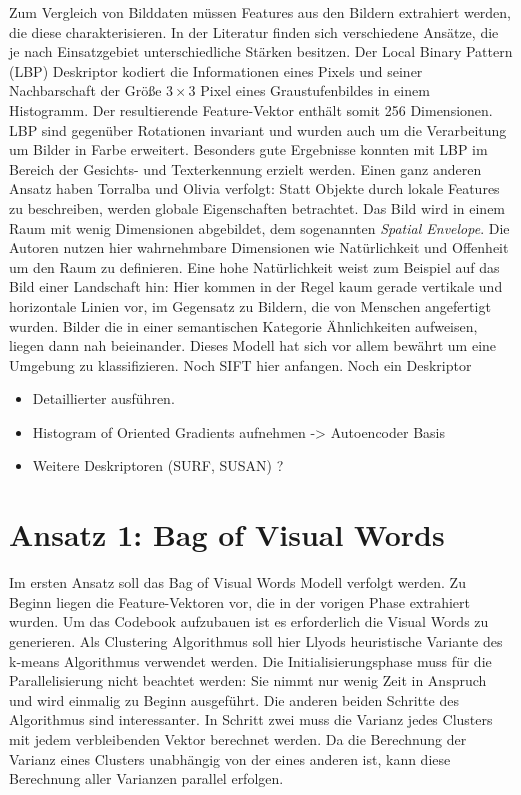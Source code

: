 Zum Vergleich von Bilddaten müssen Features aus den Bildern extrahiert werden, die diese charakterisieren. In der Literatur finden sich verschiedene Ansätze, die je nach Einsatzgebiet unterschiedliche Stärken besitzen. 
Der Local Binary Pattern (LBP) Deskriptor kodiert die Informationen eines Pixels und seiner Nachbarschaft der Größe $3 \times 3$ Pixel eines Graustufenbildes in einem Histogramm. Der resultierende Feature-Vektor enthält somit 256 Dimensionen. LBP sind gegenüber Rotationen invariant und wurden auch um die Verarbeitung um Bilder in Farbe erweitert. Besonders gute Ergebnisse konnten mit LBP im Bereich der Gesichts- und Texterkennung erzielt werden.
Einen ganz anderen Ansatz haben Torralba und Olivia verfolgt: Statt Objekte durch lokale Features zu beschreiben, werden globale Eigenschaften betrachtet. Das Bild wird in einem Raum mit wenig Dimensionen abgebildet, dem sogenannten \textit{Spatial Envelope}. Die Autoren nutzen hier wahrnehmbare Dimensionen wie Natürlichkeit und Offenheit um den Raum zu definieren. Eine hohe Natürlichkeit weist zum Beispiel auf das Bild einer Landschaft hin: Hier kommen in der Regel kaum gerade vertikale und horizontale Linien vor, im Gegensatz zu Bildern, die von Menschen angefertigt wurden.  Bilder die in einer semantischen Kategorie Ähnlichkeiten aufweisen, liegen dann nah beieinander. Dieses Modell hat sich vor allem bewährt um eine Umgebung zu klassifizieren. \cite{mts2001}
Noch SIFT hier anfangen. Noch ein Deskriptor 

\begin{itemize}
	\item Detaillierter ausführen.
	\item Histogram of Oriented Gradients aufnehmen -> Autoencoder Basis
	\item Weitere Deskriptoren (SURF, SUSAN) ?
\end{itemize}

\section{Ansatz 1: Bag of Visual Words}

Im ersten Ansatz soll das Bag of Visual Words Modell verfolgt werden. Zu Beginn liegen die Feature-Vektoren vor, die in der vorigen Phase extrahiert wurden. Um das Codebook aufzubauen ist es erforderlich die Visual Words zu generieren. Als Clustering Algorithmus soll hier Llyods heuristische Variante des k-means Algorithmus verwendet werden. Die Initialisierungsphase muss für die Parallelisierung nicht beachtet werden: Sie nimmt nur wenig Zeit in Anspruch und wird einmalig zu Beginn ausgeführt. Die anderen beiden Schritte des Algorithmus sind interessanter. In Schritt zwei muss die Varianz jedes Clusters mit jedem verbleibenden Vektor berechnet werden. Da die Berechnung der Varianz eines Clusters unabhängig von der eines anderen ist, kann diese Berechnung aller Varianzen parallel erfolgen.


